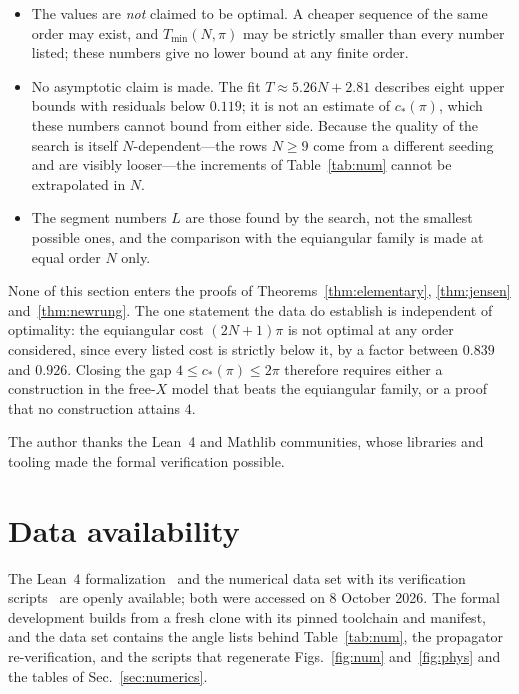 \documentclass[%
  aps,
  pra,
  preprint,
  superscriptaddress,
  amsmath,amssymb,
  nofootinbib,
  floatfix,
]{revtex4-2}
\theoremstyle{definition}
\theoremstyle{remark}
\newcommand{\cstar}{c_*}
\begin{document}
\begin{itemize}[leftmargin=1.4em,itemsep=0.15em,topsep=0.25em]
\item The values are \emph{not} claimed to be optimal. A cheaper sequence of the same order may
  exist, and $T_{\min}(N,\pi)$ may be strictly smaller than every number listed; these numbers give no lower bound at any finite order.
\item No asymptotic claim is made. The fit $T\approx5.26N+2.81$ describes eight upper bounds with
  residuals below $0.119$; it is not an estimate of $\cstar(\pi)$, which these numbers cannot bound
  from either side. Because the quality of the search is itself $N$-dependent---the rows $N\ge9$
  come from a different seeding and are visibly looser---the increments of Table~\ref{tab:num}
  cannot be extrapolated in $N$.
\item The segment numbers $L$ are those found by the search, not the smallest possible ones, and
  the comparison with the equiangular family is made at equal order $N$ only.
\end{itemize}

None of this section enters the proofs of Theorems~\ref{thm:elementary}, \ref{thm:jensen}
and~\ref{thm:newrung}. The one statement the data do establish is independent of optimality: the
equiangular cost $(2N+1)\pi$ is not optimal at any order considered, since every listed cost is
strictly below it, by a factor between $0.839$ and $0.926$. Closing the gap
$4\le\cstar(\pi)\le2\pi$ therefore requires either a construction in the free-$X$ model that
beats the equiangular family, or a proof that no construction attains $4$.





\begin{acknowledgments}
The author thanks the Lean~4 and Mathlib communities, whose libraries and tooling made the
formal verification possible.
\end{acknowledgments}

\section*{Data availability}
The Lean~4 formalization~\cite{LeanRepo} and the numerical data set with its verification
scripts~\cite{DataRepo} are openly available; both were accessed on 8 October 2026. The formal
development builds from a fresh clone with its pinned toolchain and manifest, and the data set
contains the angle lists behind Table~\ref{tab:num}, the propagator re-verification, and the
scripts that regenerate Figs.~\ref{fig:num} and~\ref{fig:phys} and the tables of
Sec.~\ref{sec:numerics}.
\end{document}
